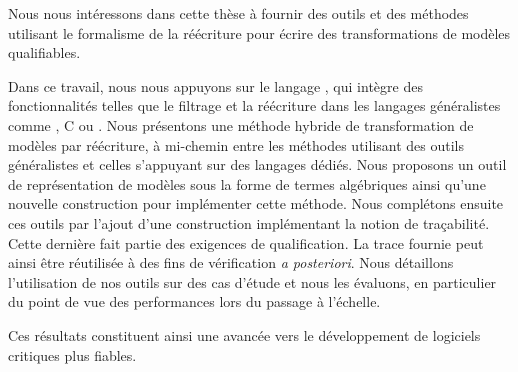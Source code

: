 \begin{ThesisAbstract}
\begin{FrenchAbstract}
\begin{spacing}{0.95}
Nous nous intéressons dans cette thèse à fournir des outils et des méthodes
utilisant le formalisme de la réécriture pour écrire des transformations de
modèles qualifiables.

Dans ce travail, nous nous appuyons sur le langage {\tom}, qui intègre des
fonctionnalités telles que le filtrage et la réécriture dans les langages
généralistes comme {\java}, C ou {\ada}. Nous présentons une méthode hybride de
transformation de modèles par réécriture, à mi-chemin entre les méthodes
utilisant des outils généralistes et celles s'appuyant sur des langages dédiés.
Nous proposons un outil de représentation de modèles sous la forme de termes
algébriques ainsi qu'une nouvelle construction {\tom} pour implémenter cette
méthode. Nous complétons ensuite ces outils par l'ajout d'une construction
implémentant la notion de traçabilité. Cette dernière fait partie des exigences
de qualification. La trace fournie peut ainsi être réutilisée à des fins de
vérification \emph{a posteriori}. Nous détaillons l'utilisation de nos outils
sur des cas d'étude et nous les évaluons, en particulier du point de vue des
performances lors du passage à l'échelle.

Ces résultats constituent ainsi une avancée vers le développement de logiciels
critiques plus fiables.



    \end{spacing}
  \end{FrenchAbstract}
  \begin{EnglishAbstract}
  \begin{spacing}{0.95}

%  
%
%


\end{spacing}
\end{EnglishAbstract}
\end{ThesisAbstract}
